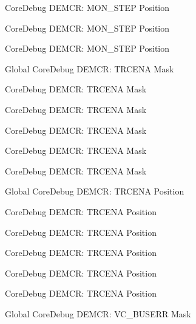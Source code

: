 \begin{DoxyRefList}
\label{deprecated__deprecated000049}%
%
Core\+Debug DEMCR\+: MON\+\_\+\+STEP Position 

\label{deprecated__deprecated000411}%
%
Core\+Debug DEMCR\+: MON\+\_\+\+STEP Position 

\label{deprecated__deprecated000602}%
%
Core\+Debug DEMCR\+: MON\+\_\+\+STEP Position  
\item[Global \doxylink{group___c_m_s_i_s___core_debug_ga5e99652c1df93b441257389f49407834}{Core\+Debug\+\_\+\+DEMCR\+\_\+\+TRCENA\+\_\+\+Msk} ]\label{deprecated__deprecated000497}%
%
Core\+Debug DEMCR\+: TRCENA Mask 

\label{deprecated__deprecated000046}%
%
Core\+Debug DEMCR\+: TRCENA Mask 

\label{deprecated__deprecated000190}%
%
Core\+Debug DEMCR\+: TRCENA Mask 

\label{deprecated__deprecated000408}%
%
Core\+Debug DEMCR\+: TRCENA Mask 

\label{deprecated__deprecated000599}%
%
Core\+Debug DEMCR\+: TRCENA Mask 

\label{deprecated__deprecated000332}%
%
Core\+Debug DEMCR\+: TRCENA Mask  
\item[Global \doxylink{group___c_m_s_i_s___core_debug_ga6ff2102b98f86540224819a1b767ba39}{Core\+Debug\+\_\+\+DEMCR\+\_\+\+TRCENA\+\_\+\+Pos} ]\label{deprecated__deprecated000407}%
%
Core\+Debug DEMCR\+: TRCENA Position 

\label{deprecated__deprecated000189}%
%
Core\+Debug DEMCR\+: TRCENA Position 

\label{deprecated__deprecated000045}%
%
Core\+Debug DEMCR\+: TRCENA Position 

\label{deprecated__deprecated000331}%
%
Core\+Debug DEMCR\+: TRCENA Position 

\label{deprecated__deprecated000598}%
%
Core\+Debug DEMCR\+: TRCENA Position 

\label{deprecated__deprecated000496}%
%
Core\+Debug DEMCR\+: TRCENA Position  
\item[Global \doxylink{group___c_m_s_i_s___core_debug_ga9d29546aefe3ca8662a7fe48dd4a5b2b}{Core\+Debug\+\_\+\+DEMCR\+\_\+\+VC\+\_\+\+BUSERR\+\_\+\+Msk} ]\label{deprecated__deprecated000422}%
%
Core\+Debug DEMCR\+: VC\+\_\+\+BUSERR Mask 


\end{DoxyRefList}
